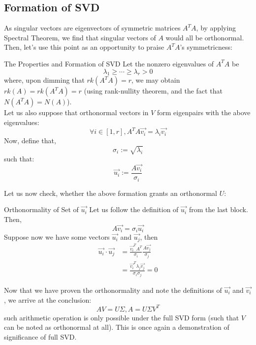 \subsection{Formation of SVD}
As singular vectors are eigenvectors of symmetric matrices $A^T A$, by applying Spectral Theorem, we find that singular vectors of $A$ would all be orthonormal.
Then, let's use this point as an opportunity to praise $A^T A$'s symmetricness:
\begin{ln-theorem}{The Properties and Formation of SVD}{}
    Let the nonzero eigenvalues of $A^T A$ be
    \[
        \lambda_1 \geq \cdots \geq \lambda_r > 0
    \]
    where, upon dimming that $rk(A^T A) = r$, we may obtain $rk(A) = rk(A^T A) = r$ (using rank-nullity theorem, and the fact that $N(A^T A) = N(A)$). \\
    Let us also suppose that orthonormal vectors in $V$ form eigenpairs with the above eigenvalues:
    \[
        \forall i \in [1, r], A^T A \vec{v_i} = \lambda_i \vec{v_i}
    \]
    Now, define that,
    \[
        \sigma_i := \sqrt{\lambda_i}
    \]
    such that:
    \[
        \vec{u_i} := \frac{A \vec{v_i}}{\sigma_i}
    \]
\end{ln-theorem}
Let us now check, whether the above formation grants an orthonormal $U$:
\begin{ln-explain}{Orthonormality of Set of $\vec{u_i}$}{}
    Let us follow the definition of $\vec{u_i}$ from the last block. \\
    Then,
    \[A \vec{v_i} = \sigma_i \vec{u_i}\]
    Suppose now we have some vectors $\vec{u_i}$ and $\vec{u_j}$, then
    \begin{align*}
        \vec{u_i} \cdot \vec{u_j}
        &= \frac{\vec{v_i}^T A^T}{\sigma_i} \frac{A \vec{v_j}}{\sigma_j} \\
        &= \frac{\vec{v_i}^T \lambda_j \vec{v_j}}{\sigma_i \sigma_j} = 0
    \end{align*}
\end{ln-explain}
Now that we have proven the orthonormality and note the definitions of $\vec{u_i}$ and $\vec{v_i}$, we arrive at the conclusion:
\[
    A V = U \Sigma, A = U \Sigma V^T
\]
such arithmetic operation is only possible under the full SVD form (such that $V$ can be noted as orthonormal at all).
This is once again a demonstration of significance of full SVD.

